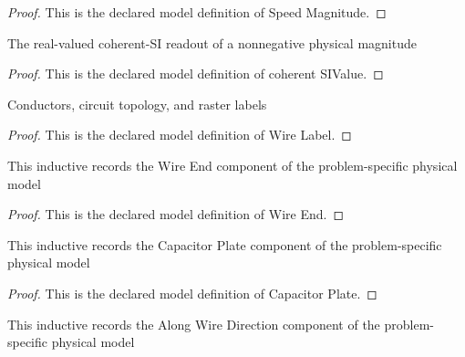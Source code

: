 \begin{proof}
  This is the declared model definition of Speed Magnitude.
\end{proof}
\begin{definition}
  \label{def:physics:phyx-mini-0971:phyxminiproblems-problemphyxmini0971-coherentsivalue}
  The real-valued coherent-SI readout of a nonnegative physical magnitude
\end{definition}
\begin{proof}
  This is the declared model definition of coherent SIValue.
\end{proof}
\begin{definition}
  \label{def:physics:phyx-mini-0971:phyxminiproblems-problemphyxmini0971-wirelabel}
  Conductors, circuit topology, and raster labels
\end{definition}
\begin{proof}
  This is the declared model definition of Wire Label.
\end{proof}
\begin{definition}
  \label{def:physics:phyx-mini-0971:phyxminiproblems-problemphyxmini0971-wireend}
  This inductive records the Wire End component of the problem-specific physical model
\end{definition}
\begin{proof}
  This is the declared model definition of Wire End.
\end{proof}
\begin{definition}
  \label{def:physics:phyx-mini-0971:phyxminiproblems-problemphyxmini0971-capacitorplate}
  This inductive records the Capacitor Plate component of the problem-specific physical model
\end{definition}
\begin{proof}
  This is the declared model definition of Capacitor Plate.
\end{proof}
\begin{definition}
  \label{def:physics:phyx-mini-0971:phyxminiproblems-problemphyxmini0971-alongwiredirection}
  This inductive records the Along Wire Direction component of the problem-specific physical model
\end{definition}
